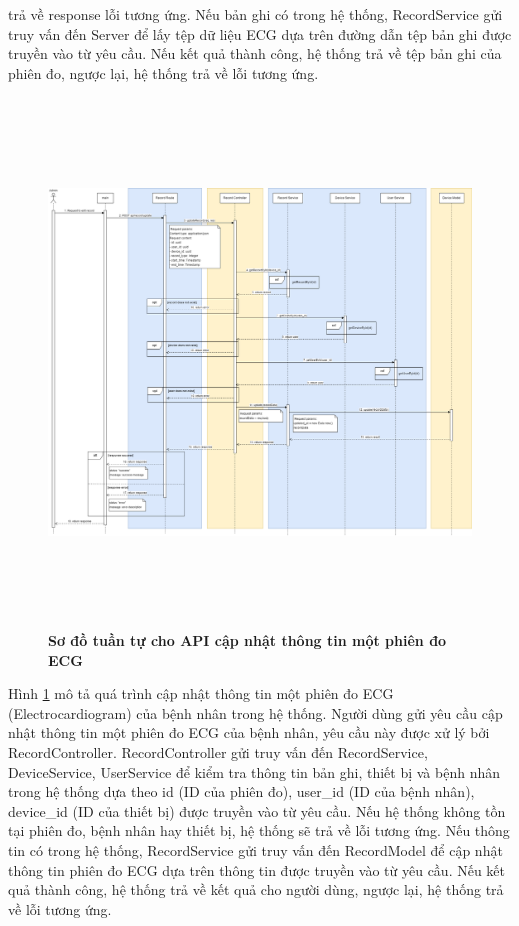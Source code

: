trả về response lỗi tương ứng. Nếu bản ghi có trong hệ thống, RecordService gửi truy vấn đến Server để lấy tệp dữ liệu ECG dựa trên đường dẫn tệp bản ghi được truyền vào từ yêu cầu. 
Nếu kết quả thành công, hệ thống trả về tệp bản ghi của phiên đo, ngược lại, hệ thống trả về lỗi tương ứng.
 \begin{figure}[H]
  \centering
  \includegraphics[width=16cm,height=14cm]{Images/sequence_api/editRecordById.png}
  \caption[Sơ đồ tuần tự cho API cập nhật thông tin một phiên đo ECG ]{\bfseries \fontsize{12pt}{0pt}
  \selectfont Sơ đồ tuần tự cho API cập nhật thông tin một phiên đo ECG }
  \label{api_editRecordById} %
\end{figure}
Hình \ref{api_editRecordById} mô tả quá trình cập nhật thông tin một phiên đo ECG (Electrocardiogram) của bệnh nhân trong hệ thống. Người dùng gửi yêu cầu cập nhật thông tin một phiên đo ECG của bệnh nhân, 
yêu cầu này được xử lý bởi RecordController. RecordController gửi truy vấn đến RecordService, DeviceService, UserService để kiểm tra thông tin bản ghi, thiết bị và bệnh nhân trong hệ thống dựa theo id (ID của phiên đo), user\_id (ID của bệnh nhân), device\_id (ID của thiết bị)
 được truyền vào từ yêu cầu. Nếu hệ thống không tồn tại phiên đo, bệnh nhân hay thiết bị, hệ thống sẽ trả về lỗi tương ứng. Nếu thông tin có trong hệ thống, RecordService gửi truy vấn đến RecordModel để cập nhật thông tin
phiên đo ECG dựa trên thông tin được truyền vào từ yêu cầu. Nếu kết quả thành công, hệ thống trả về kết quả cho người dùng, ngược lại, hệ thống trả về lỗi tương ứng.

